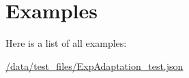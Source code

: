 \section{Examples}
Here is a list of all examples\+:\begin{DoxyCompactItemize}
\item 
\hyperlink{_2data_2test_files_2ExpAdaptation_test_8json-example}{/data/test\+\_\+files/\+Exp\+Adaptation\+\_\+test.\+json}
\end{DoxyCompactItemize}
